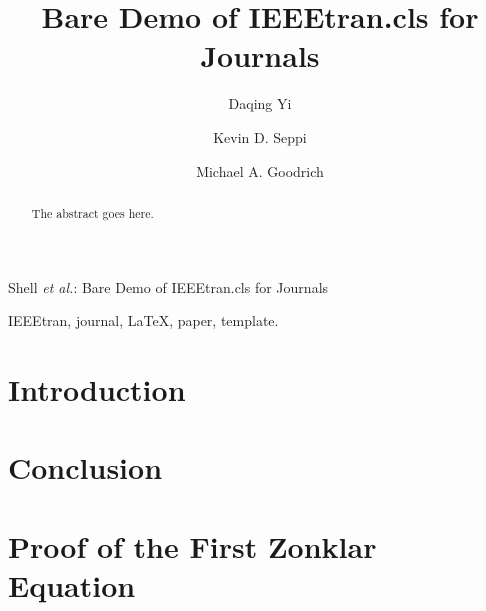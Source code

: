 \documentclass[journal]{IEEEtran}
\begin{document}
\title{Bare Demo of IEEEtran.cls for Journals}

\author{Daqing Yi \and Kevin D. Seppi \and Michael A. Goodrich}

%
{Shell \MakeLowercase{\textit{et al.}}: Bare Demo of IEEEtran.cls for Journals}

\maketitle

\begin{abstract}
The abstract goes here.
\end{abstract}

\begin{IEEEkeywords}
IEEEtran, journal, \LaTeX, paper, template.
\end{IEEEkeywords}

\IEEEpeerreviewmaketitle

\section{Introduction}

\section{Conclusion}

\appendices
\section{Proof of the First Zonklar Equation}
\end{document}
